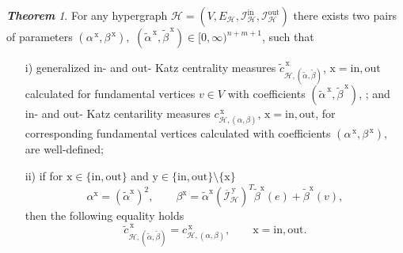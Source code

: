 \documentclass[a4paper,12pt]{article}
\theoremstyle{definition}
\theoremstyle{remark}
\newcommand{\mH}{\mathcal{H}}
\newcommand{\EH}{E_{\mathcal{H}}}
\newcommand{\tin}{\mathrm{in}}
\newcommand{\out}{\mathrm{out}}
\newcommand{\inci}{\mathcal{I}^{\tin}}
\newcommand{\inco}{\mathcal{I}^{\out}}
\newtheorem{thm}{\small\bf Theorem}
\begin{document}
\begin{thm}\label{thm:alpha-beta}
For any hypergraph $\mH=(V, \EH,\inci_\mH,\inco_\mH)$ there exists two pairs of parameters $(\alpha^{\,\textrm{x}}, \beta^{\,\textrm{x}}),$ $ (\tilde{\alpha}^{\,\textrm{x}}, \tilde{\beta}^{\,\textrm{x}})\in [0,\infty)^{n+m+1}$, such that 
\begin{itemize}
\item[i)] generalized in- and out- Katz centrality measures $\tilde{c}_{\mH,(\tilde{\alpha},\tilde{\beta})}^{\,\textrm{x}}$, $\textrm{x}=\tin, \out$ calculated for fundamental vertices $v\in V$ with coefficients $(\tilde{\alpha}^{\,\textrm{x}}, \tilde{\beta}^{\,\textrm{x}})$, ; and in- and out- Katz centarility measures $c_{\mH,(\alpha,\beta)}^{\,\textrm{x}}$, $\textrm{x}=\tin, \out$, for corresponding fundamental vertices calculated with coefficients $(\alpha^{\,\textrm{x}}, \beta^{\,\textrm{x}})$, are well-defined;
\item[ii)] if for $\textrm{x}\in\{\tin,\out\}$ and $\textrm{y}\in\{\tin,\out\}\setminus\{\textrm{x}\}$  
\begin{equation}\label{eq:as_tw2}
\alpha^{\textrm{x}}=(\tilde{\alpha}^{\textrm{x}})^2,\qquad \beta^{\textrm{x}}=\tilde{\alpha}^{\textrm{x}}(\overline{\mathcal{I}}_{\mH}^{\,\textrm{y}})^T \tilde{\beta}^{\textrm{x}}(e)+\tilde{\beta}^{\textrm{x}}(v),
\end{equation}
then the following equality holds
\begin{equation}\label{eq:K_cent_equal}
\tilde{c}^{\,\textrm{x}}_{\mH,(\tilde{\alpha},\tilde{\beta})}=c^{\,\textrm{x}}_{\mH,(\alpha,\beta)},\qquad \textrm{x}=\tin,\out.
\end{equation}
\end{itemize}
\end{thm}
\end{document}
